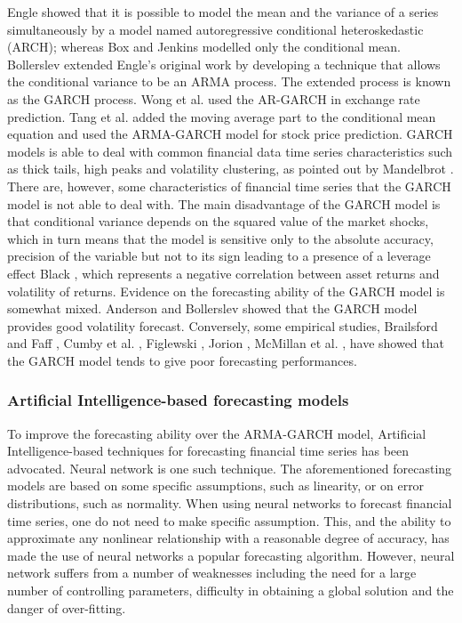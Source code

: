 Engle \cite{Engel} showed that it is possible to model the mean and the variance of a series simultaneously by a model named autoregressive conditional heteroskedastic (ARCH); whereas Box and Jenkins \cite{B&J} modelled only the conditional mean. Bollerslev \cite{Bollerslev} extended Engle’s \cite{Engel} original work by developing a technique that allows the conditional variance to be an ARMA process. The extended process is known as the GARCH process. Wong et al. \cite{Wetal} used the AR-GARCH in exchange rate prediction. Tang et al. \cite{Tetal} added the moving average part to the conditional mean equation and used the ARMA-GARCH model for stock price prediction. GARCH models is able to deal with common financial data time series characteristics such as thick tails, high peaks and volatility clustering, as pointed out by Mandelbrot \cite{Mandelbrot}. There are, however, some characteristics of financial time series that the GARCH model is not able to deal with. The main disadvantage of the GARCH model is that conditional variance depends on the squared value of the market shocks, which in turn means that the model is sensitive only to the absolute accuracy, precision of the variable but not to its sign leading to a presence of a leverage effect Black \cite{Black}, which represents a negative correlation between asset returns and volatility of returns. Evidence on the forecasting ability of the GARCH model is somewhat mixed. Anderson and Bollerslev \cite{A&B} showed that the GARCH model provides good volatility forecast. Conversely, some empirical studies, Brailsford and Faff \cite{f1}, Cumby et al. \cite{f2}, Figlewski \cite{f3},  Jorion \cite{f4}\cite{f5}, McMillan et al. \cite{f6}, have showed that the GARCH model tends to give poor forecasting performances. 

\subsubsection{Artificial Intelligence-based forecasting models}

To improve the forecasting ability over the ARMA-GARCH model, Artificial Intelligence-based techniques for forecasting financial time series has been advocated. Neural network is one such technique. The aforementioned forecasting models are based on some specific assumptions, such as linearity, or on error distributions, such as normality. When using neural networks to forecast financial time series, one do not need to make specific assumption. This, and the ability to approximate any nonlinear relationship with a reasonable degree of accuracy, has made the use of neural networks a popular forecasting algorithm. However, neural network suffers from a number of weaknesses including the need for a large number of controlling parameters, difficulty in obtaining a global solution and the danger of over-fitting.

